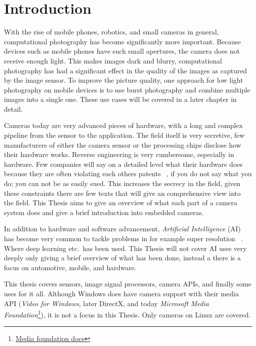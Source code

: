 \chapter{Introduction\label{intro}}
With the rise of mobile phones, robotics, and small cameras in general,
computational photography has become significantly more important. Because
devices such as mobile phones have such small apertures, the camera does not
receive enough light. This makes images dark and blurry, computational
photography has had a significant effect in the quality of the images as
captured by the image sensor. To improve the picture quality, one approach for
low light photography on mobile devices is to use burst photography and combine
multiple images into a single one\cite{burstPhotMobile}. These use cases will
be covered in a later chapter in detail.

Cameras today are very advanced pieces of hardware, with a long and complex
pipeline from the sensor to the application. The field itself is very
secretive, few manufacturers of either the camera sensor or the processing
chips disclose how their hardware works. Reverse engineering is very
cumbersome, especially in hardware. Few companies will say on a detailed level
what their hardware does because they are often violating each others patents~
\cite{experimentalCompPhot}, if you do not say what you do; you can not be as easily
sued. This increases the secrecy in the field, given these constraints there
are few texts that will give an comprehensive view into the field. This Thesis
aims to give an overview of what each part of a camera system does and give a
brief introduction into embedded cameras.

In addition to hardware and software advancement, \textit{Artificial Intelligence} (AI)
has become very common to tackle problems in for example super resolution~
\cite{yangDeepLearningSingle2019, delbracio2021mobile}. Where deep
learning etc.\ has been used. This Thesis will not cover AI uses very deeply
only giving a brief overview of what has been done, instead a there is a focus
on automotive, mobile, and hardware.

This thesis covers sensors, image signal processors, camera APIs, and finally
some uses for it all. Although Windows does have camera support with their
media API (\textit{Video for Windows}, later DirectX, and today
\textit{Microsoft Media Foundation}\footnote{\href{https://learn.microsoft.com/en-us/windows/win32/medfound/microsoft-media-foundation-sdk}{Media
foundation docs}}), it is not a focus in this Thesis. Only cameras on Linux are
covered.
